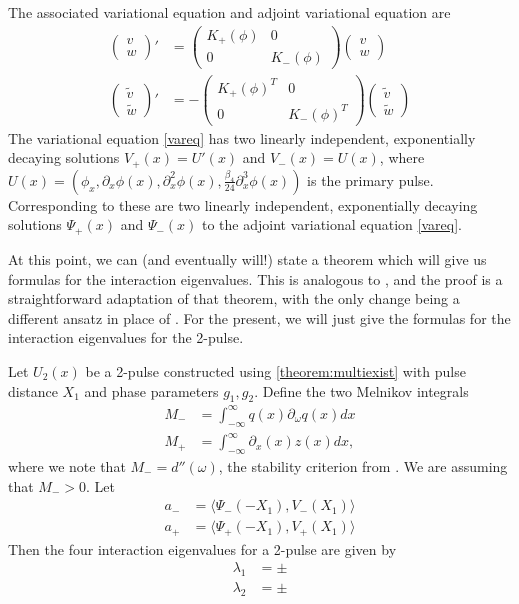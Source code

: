 \documentclass[12pt]{article}
\begin{document}
The associated variational equation and adjoint variational equation are
\begin{align}
\begin{pmatrix}v \\ w\end{pmatrix}' &=
\begin{pmatrix}K_+(\phi) & 0 \\ 0 & K_-(\phi) \end{pmatrix}
\begin{pmatrix}v \\ w\end{pmatrix} \label{vareq} \\
\begin{pmatrix}\tilde{v} \\ \tilde{w}\end{pmatrix}' &=
-\begin{pmatrix}K_+(\phi)^T & 0 \\ 0 & K_-(\phi)^T \end{pmatrix}
\begin{pmatrix}\tilde{v} \\ \tilde{w}\end{pmatrix} \label{adjvareq}
\end{align}
The variational equation \cref{vareq} has two linearly independent, exponentially decaying solutions $V_+(x) = U'(x)$ and $V_-(x) = U(x)$, where $U(x) = (\phi_x, \partial_x \phi(x), \partial_x^2 \phi(x), \frac{\beta_4}{24} \partial_x^3 \phi(x))$ is the primary pulse. Corresponding to these are two linearly independent, exponentially decaying solutions $\Psi_+(x)$ and $\Psi_-(x)$ to the adjoint variational equation \cref{vareq}. 

At this point, we can (and eventually will!) state a theorem which will give us formulas for the interaction eigenvalues. This is analogous to \cite[Theorem 2]{Sandstede1998}, and the proof is a straightforward adaptation of that theorem, with the only change being a different ansatz in place of \cite[(3.5)]{Sandstede1998}. For the present, we will just give the formulas for the interaction eigenvalues for the 2-pulse.

Let $U_2(x)$ be a 2-pulse constructed using \cref{theorem:multiexist} with pulse distance $X_1$ and phase parameters $g_1, g_2$. Define the two Melnikov integrals
\begin{align*}
M_- &= \int_{-\infty}^\infty q(x) \partial_\omega q(x) dx \\
M_+ &= \int_{-\infty}^\infty \partial_x (x) z(x) dx,
\end{align*}
where we note that $M_- = d''(\omega)$, the stability criterion from \cite{Grillakis1987}. We are assuming that $M_- > 0$. Let 
\begin{align*}
a_- &= \langle \Psi_-(-X_1), V_-(X_1) \rangle \\
a_+ &= \langle \Psi_+(-X_1), V_+(X_1) \rangle 
\end{align*}
Then the four interaction eigenvalues for a 2-pulse are given by
\begin{align*}
\lambda_1 &= \pm \\
\lambda_2 &= \pm
\end{align*}
\end{document}
